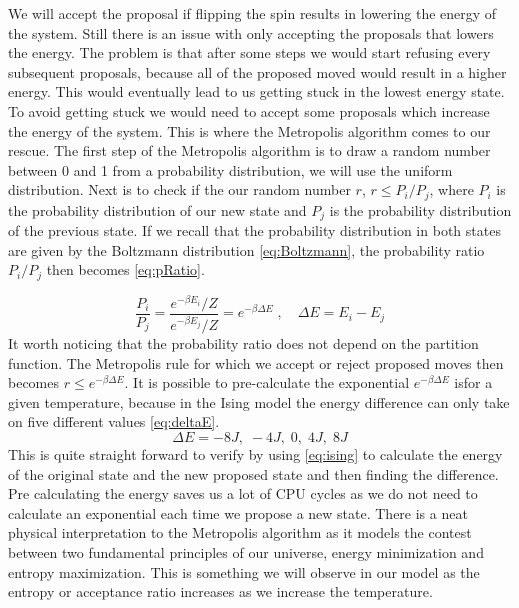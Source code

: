 We will
accept the proposal if flipping the spin results in lowering the energy of the
system. Still there is an issue with only accepting the proposals that lowers
the energy. The problem  is that after some steps we would start refusing every
subsequent proposals, because all of the proposed moved would result in a higher
energy. This would eventually lead to us getting stuck in the lowest energy
state. To avoid getting stuck we would need to accept some proposals which
increase the energy of the system. This is where the Metropolis
algorithm comes to our rescue. The first step of the Metropolis algorithm is to
draw a random number between 0 and 1 from a probability distribution, we will
use the uniform distribution. Next is to check if the our random number $r$,  $r \leq P_i
/P_j$, where $P_i$ is the probability distribution of our new state and $P_j$ is
the probability distribution of the previous state. If we recall that the
probability distribution in both states are given by the Boltzmann distribution
\cref{eq:Boltzmann}, the probability ratio $P_i/P_j$ then becomes \cref{eq:pRatio}.

\begin{equation}\label{eq:pRatio}
  \frac{P_i}{P_j} = \frac{e^{-\beta E_i}/Z}{e^{-\beta E_j}/Z} = e^{-\beta \Delta E} \; , \quad \Delta E = E_i - E_j
\end{equation}
It worth noticing that the probability ratio does not depend on the partition
function. The Metropolis rule for which we accept or reject proposed moves then
becomes $r \leq e^{-\beta \Delta E}$. It is possible to pre-calculate the
exponential $e^{-\beta \Delta E}$ isfor a given temperature, because in the
Ising model the energy difference can only take on five different values
\cref{eq:deltaE}.
\begin{equation}\label{eq:deltaE}
  \Delta E = -8J, \; -4J, \; 0, \; 4J, \; 8J
\end{equation}
This is quite straight forward to verify by using \cref{eq:ising} to calculate
the energy of the original state and the new proposed
state and then finding the difference. Pre calculating the energy saves us a lot
of CPU cycles as we do not need to calculate an exponential each time we propose
a new state. There is a neat physical interpretation to the Metropolis
algorithm as it models the contest between two fundamental principles of our
universe, energy minimization and entropy maximization. This is something we
will observe in our model as the entropy or acceptance ratio increases as we
increase the temperature.


